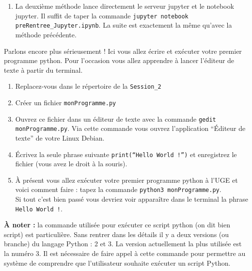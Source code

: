 \documentclass{article}
\begin{document}
\begin{exercice}
\begin{enumerate}
\begin{enumerate}
\item
La deuxième méthode lance directement le serveur jupyter et le notebook jupyter. Il suffit de taper la commande \texttt{jupyter notebook preRentree\_Jupyter.ipynb}. La suite est exactement la même qu'avec la méthode précédente.
\end{enumerate}

\end{enumerate}

\end{exercice}

\begin{exercice}

Parlons encore plus sérieusement ! Ici vous allez écrire et exécuter votre premier programme python.
Pour l'occasion vous allez apprendre à lancer l'éditeur de texte à partir du terminal. 

\begin{enumerate}

\item
Replacez-vous dans le répertoire de la \texttt{Session\_2}
\item
Créer un fichier \texttt{monProgramme.py}
\item
Ouvrez ce fichier dans un éditeur de texte avec la commande \texttt{gedit monProgramme.py}. Via cette commande vous ouvrez l'application ``Éditeur de texte'' de votre Linux Debian.
\item
Écrivez la seule phrase suivante \texttt{print(``Hello World !'')} et enregistrez le fichier (vous avez le droit à la souris).
\item
À présent vous allez exécuter votre premier programme python à l'UGE et voici comment faire : tapez la commande \texttt{python3 monProgramme.py}.\\ 
Si tout c'est bien passé vous devriez voir apparaître dans le terminal la phrase \texttt{Hello World !}.
\end{enumerate}

\textbf{À noter : } la commande utilisée pour exécuter ce script python (on dit bien script) est particulière. Sans rentrer dans les détails il y a deux versions (ou branche) du langage Python : 2 et 3. La version actuellement la plus utilisée est la numéro 3. Il est nécessaire de faire appel à cette commande pour permettre au système de comprendre que l'utilisateur souhaite exécuter un script Python. 

\end{exercice}
\end{document}
